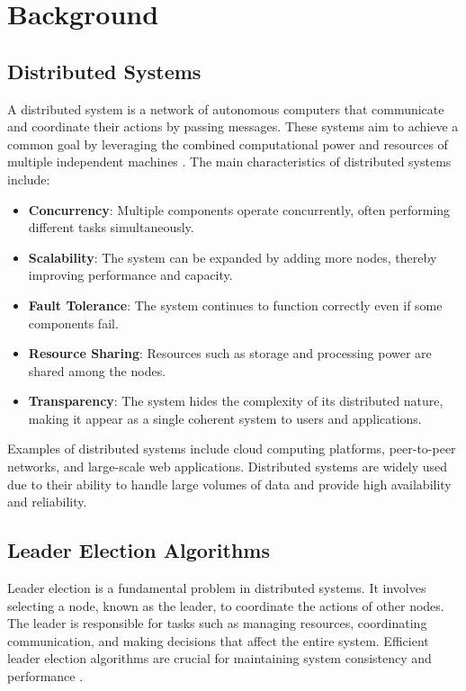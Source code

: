\chapter{Background}

\section{Distributed Systems}
A distributed system is a network of autonomous computers that communicate and coordinate their actions by passing messages. These systems aim to achieve a common goal by leveraging the combined computational power and resources of multiple independent machines \cite{Ref1}. The main characteristics of distributed systems include:

\begin{itemize}
    \item \textbf{Concurrency}: Multiple components operate concurrently, often performing different tasks simultaneously.
    \item \textbf{Scalability}: The system can be expanded by adding more nodes, thereby improving performance and capacity.
    \item \textbf{Fault Tolerance}: The system continues to function correctly even if some components fail.
    \item \textbf{Resource Sharing}: Resources such as storage and processing power are shared among the nodes.
    \item \textbf{Transparency}: The system hides the complexity of its distributed nature, making it appear as a single coherent system to users and applications.
\end{itemize}

Examples of distributed systems include cloud computing platforms, peer-to-peer networks, and large-scale web applications. Distributed systems are widely used due to their ability to handle large volumes of data and provide high availability and reliability.

\section{Leader Election Algorithms}
Leader election is a fundamental problem in distributed systems. It involves selecting a node, known as the leader, to coordinate the actions of other nodes. The leader is responsible for tasks such as managing resources, coordinating communication, and making decisions that affect the entire system. Efficient leader election algorithms are crucial for maintaining system consistency and performance \cite{Ref2}.


